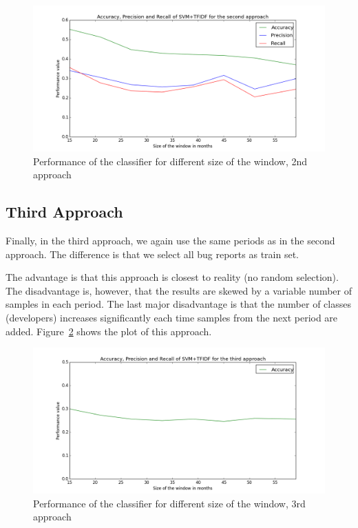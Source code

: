 \begin{figure}[htbp]
    \centering
        \includegraphics[width=\textwidth]{./images/window_size/firefox_2a.png}
    \caption{Performance of the classifier for different size of the window, 2nd approach}
    \label{fig:window.firefox.2a}
\end{figure}

\subsection{Third Approach}

Finally, in the third approach, we again use the same periods as in the second approach. The difference is that we select all bug reports as train set.

The advantage is that this approach is closest to reality (no random selection). The disadvantage is, however, that the results are skewed by a variable number of samples in each period. The last major disadvantage is that the number of classes (developers) increases significantly each time samples from the next period are added. Figure~\ref{fig:window.firefox.3a} shows the plot of this approach.

\begin{figure}[htbp]
    \centering
        \includegraphics[width=\textwidth]{./images/window_size/firefox_3a.png}
    \caption{Performance of the classifier for different size of the window, 3rd approach}
    \label{fig:window.firefox.3a}
\end{figure}

